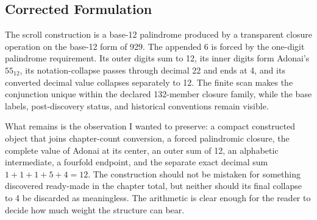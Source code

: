 \subsection{Corrected Formulation}

The scroll construction is a base-12 palindrome produced by a transparent closure operation on the base-12 form of 929. The appended 6 is forced by the one-digit palindrome requirement. Its outer digits sum to 12, its inner digits form Adonai's $55_{12}$, its notation-collapse passes through decimal 22 and ends at 4, and its converted decimal value collapses separately to 12. The finite scan makes the conjunction unique within the declared 132-member closure family, while the base labels, post-discovery status, and historical conventions remain visible.

What remains is the observation I wanted to preserve: a compact constructed object that joins chapter-count conversion, a forced palindromic closure, the complete value of Adonai at its center, an outer sum of 12, an alphabetic intermediate, a fourfold endpoint, and the separate exact decimal sum $1+1+1+5+4=12$. The construction should not be mistaken for something discovered ready-made in the chapter total, but neither should its final collapse to 4 be discarded as meaningless. The arithmetic is clear enough for the reader to decide how much weight the structure can bear.
